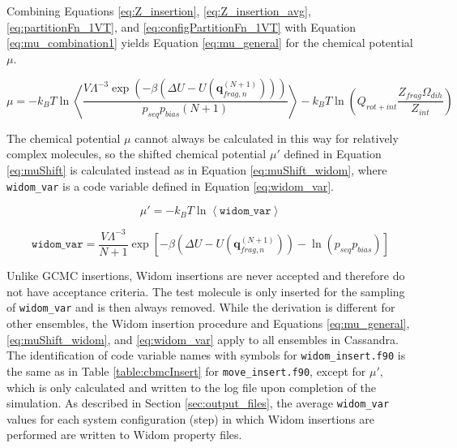 Combining Equations \ref{eq:Z_insertion}, \ref{eq:Z_insertion_avg}, \ref{eq:partitionFn_1VT}, and \ref{eq:configPartitionFn_1VT} with Equation \ref{eq:mu_combination1} yields Equation \ref{eq:mu_general} for the chemical potential $\mu$.

\begin{equation}
    \label{eq:mu_general}
    \mu = -k_B T \ln{\left\langle \frac{V\Lambda^{-3}  \exp{(-\beta({\Delta}U-U (\mathbf{q}_{frag,n}^{(N+1)} )))}}{p_{seq} p_{bias} (N+1)} \right\rangle}
    - k_B T \ln\left( Q_{rot+int} \frac{Z_{frag}\Omega_{dih}}{Z_{int}} \right)
\end{equation}

The chemical potential $\mu$ cannot always be calculated in this way for relatively complex molecules, so the shifted chemical potential $\mu'$ defined in Equation \ref{eq:muShift} is calculated instead as in Equation \ref{eq:muShift_widom}, where \texttt{widom\_var} is a code variable defined in Equation \ref{eq:widom_var}.

\begin{equation}
    \label{eq:muShift_widom}
    \mu' = -k_B T \ln{\left\langle \texttt{widom\_var} \right\rangle}
\end{equation}


\begin{equation}
\label{eq:widom_var}
    \texttt{widom\_var} = \frac{V\Lambda^{-3}}{N+1} \exp{\left[-\beta({\Delta}U-U (\mathbf{q}_{frag,n}^{(N+1)} )) - \ln{(p_{seq} p_{bias})}\right]} 
\end{equation}

Unlike GCMC insertions, Widom insertions are never accepted and therefore do not have acceptance criteria.  The test molecule is only inserted for the sampling of \texttt{widom\_var} and is then always removed. While the derivation is different for other ensembles, the Widom insertion procedure and Equations \ref{eq:mu_general}, \ref{eq:muShift_widom}, and \ref{eq:widom_var} apply to all ensembles in Cassandra.  The identification of code variable names with symbols for \texttt{widom\_insert.f90} is the same as in Table \ref{table:cbmcInsert} for \texttt{move\_insert.f90}, except for $\mu'$, which is only calculated and written to the log file upon completion of the simulation.  As described in Section \ref{sec:output_files}, the average  \texttt{widom\_var} values for each system configuration (step) in which Widom insertions are performed are written to Widom property files.